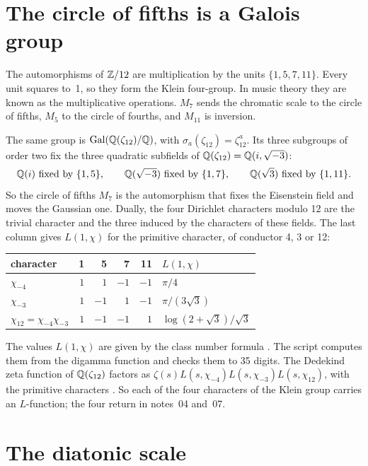\documentclass[11pt]{article}
\begin{document}
\section{The circle of fifths is a Galois group}

The automorphisms of $\mathbb{Z}/12$ are multiplication by the units $\{1,5,7,11\}$.
Every unit squares to~1, so they form the Klein four-group.
In music theory they are known as the multiplicative operations.
$M_7$ sends the chromatic scale to the circle of fifths, $M_5$ to the circle of fourths, and $M_{11}$ is inversion.

The same group is $\mathrm{Gal}(\mathbb{Q}(\zeta_{12})/\mathbb{Q})$, with $\sigma_a(\zeta_{12}) = \zeta_{12}^a$.
Its three subgroups of order two fix the three quadratic subfields of $\mathbb{Q}(\zeta_{12}) = \mathbb{Q}(i,\sqrt{-3})$:
\[
  \mathbb{Q}(i)\ \text{fixed by}\ \{1,5\},\qquad \mathbb{Q}(\sqrt{-3})\ \text{fixed by}\ \{1,7\},\qquad \mathbb{Q}(\sqrt3)\ \text{fixed by}\ \{1,11\}.
\]
So the circle of fifths $M_7$ is the automorphism that fixes the Eisenstein field and moves the Gaussian one.
Dually, the four Dirichlet characters modulo 12 are the trivial character and the three induced by the characters of these fields. The last column gives $L(1,\chi)$ for the primitive character, of conductor 4, 3 or 12:

\begin{center}
\begin{tabular}{@{}lrrrrl@{}}
\toprule
character & 1 & 5 & 7 & 11 & $L(1,\chi)$\\
\midrule
$\chi_{-4}$ & $1$ & $1$ & $-1$ & $-1$ & $\pi/4$\\
$\chi_{-3}$ & $1$ & $-1$ & $1$ & $-1$ & $\pi/(3\sqrt3)$\\
$\chi_{12} = \chi_{-4}\chi_{-3}$ & $1$ & $-1$ & $-1$ & $1$ & $\log(2+\sqrt3)/\sqrt3$\\
\bottomrule
\end{tabular}
\end{center}

\noindent
The values $L(1,\chi)$ are given by the class number formula \cite{Davenport}.
The script computes them from the digamma function and checks them to 35 digits.
The Dedekind zeta function of $\mathbb{Q}(\zeta_{12})$ factors as $\zeta(s)L(s,\chi_{-4})L(s,\chi_{-3})L(s,\chi_{12})$, with the primitive characters \cite{Washington}.
So each of the four characters of the Klein group carries an $L$-function; the four return in notes~04 and~07.

\section{The diatonic scale}
\end{document}
